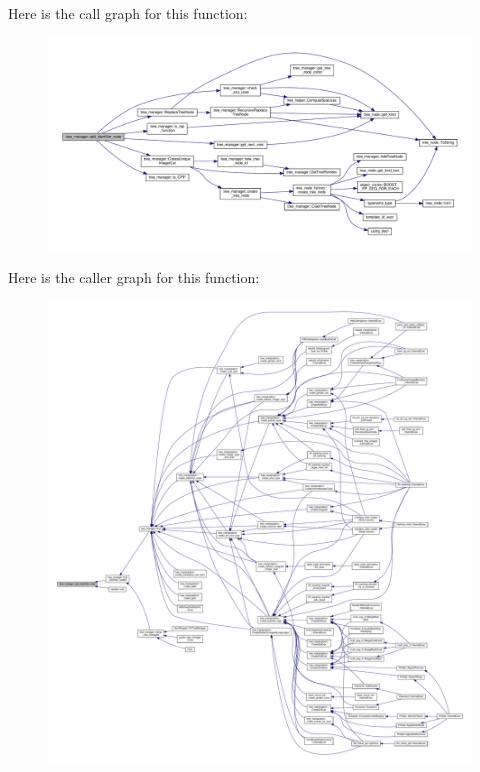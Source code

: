 Here is the call graph for this function\+:
\nopagebreak
\begin{figure}[H]
\begin{center}
\leavevmode
\includegraphics[width=350pt]{d2/ddd/classtree__manager_a109bce483e98aa5940917e1e84cea480_cgraph}
\end{center}
\end{figure}
Here is the caller graph for this function\+:
\nopagebreak
\begin{figure}[H]
\begin{center}
\leavevmode
\includegraphics[width=350pt]{d2/ddd/classtree__manager_a109bce483e98aa5940917e1e84cea480_icgraph}
\end{center}
\end{figure}
\mbox{\label{classtree__manager_ae318c7957e92feef578a52f2858d4f50}} 
